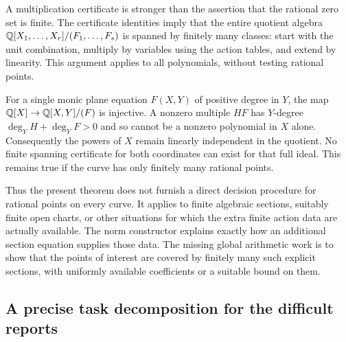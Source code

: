 A multiplication certificate is stronger than the assertion that the
rational zero set is finite. The certificate identities imply that the
entire quotient algebra $\mathbb Q[X_1,\ldots,X_r]/(F_1,\ldots,F_s)$
is spanned by finitely many classes: start with the unit combination,
multiply by variables using the action tables, and extend by linearity.
This argument applies to all polynomials, without testing rational points.

For a single monic plane equation $F(X,Y)$ of positive degree in $Y$,
the map $\mathbb Q[X]\to\mathbb Q[X,Y]/(F)$ is injective. A nonzero multiple
$HF$ has $Y$-degree $\deg_Y H+\deg_Y F>0$ and so cannot be a
nonzero polynomial in $X$ alone. Consequently the powers of $X$
remain linearly independent in the quotient. No finite spanning
certificate for both coordinates can exist for that full ideal.
This remains true if the curve has only finitely many rational points.

Thus the present theorem does not furnish a direct decision procedure
for rational points on every curve. It applies to finite algebraic
sections, suitably finite open charts, or other situations for which
the extra finite action data are actually available. The norm constructor
explains exactly how an additional section equation supplies those data.
The missing global arithmetic work is to show that the points of
interest are covered by finitely many such explicit sections, with
uniformly available coefficients or a suitable bound on them.

\subsection{A precise task decomposition for the difficult reports}

